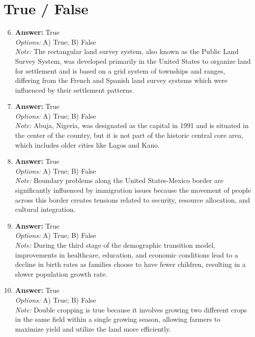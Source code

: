\documentclass[12pt]{article}
\begin{document}
\section*{True / False}
\begin{enumerate}[label=\arabic*.]
\setcounter{enumi}{5}
\item \textbf{Answer:} True
\\ \textit{Options:} A) True; B) False
\\ \textit{Note:} The rectangular land survey system, also known as the Public Land Survey System, was developed primarily in the United States to organize land for settlement and is based on a grid system of townships and ranges, differing from the French and Spanish land survey systems which were influenced by their settlement patterns.
\item \textbf{Answer:} True
\\ \textit{Options:} A) True; B) False
\\ \textit{Note:} Abuja, Nigeria, was designated as the capital in 1991 and is situated in the center of the country, but it is not part of the historic central core area, which includes older cities like Lagos and Kano.
\item \textbf{Answer:} True
\\ \textit{Options:} A) True; B) False
\\ \textit{Note:} Boundary problems along the United States-Mexico border are significantly influenced by immigration issues because the movement of people across this border creates tensions related to security, resource allocation, and cultural integration.
\item \textbf{Answer:} True
\\ \textit{Options:} A) True; B) False
\\ \textit{Note:} During the third stage of the demographic transition model, improvements in healthcare, education, and economic conditions lead to a decline in birth rates as families choose to have fewer children, resulting in a slower population growth rate.
\item \textbf{Answer:} True
\\ \textit{Options:} A) True; B) False
\\ \textit{Note:} Double cropping is true because it involves growing two different crops in the same field within a single growing season, allowing farmers to maximize yield and utilize the land more efficiently.
\end{enumerate}
\end{document}
